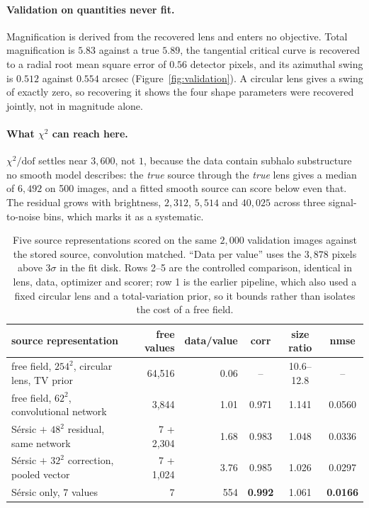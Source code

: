 \documentclass{article}
\begin{document}
\paragraph{Validation on quantities never fit.} Magnification is derived from the
recovered lens and enters no objective. Total magnification is $5.83$ against a
true $5.89$, the tangential critical curve is recovered to a radial root mean
square error of $0.56$ detector pixels, and its azimuthal swing is $0.512$
against $0.554$ arcsec (Figure~\ref{fig:validation}). A circular lens gives a
swing of exactly zero, so recovering it shows the four shape parameters were
recovered jointly, not in magnitude alone.

\paragraph{What $\chi^{2}$ can reach here.} $\chi^{2}/\mathrm{dof}$ settles near
$3{,}600$, not $1$, because the data contain subhalo substructure no smooth model
describes: the \emph{true} source through the \emph{true} lens gives a median of
$6{,}492$ on 500 images, and a fitted smooth source can score below even that.
The residual grows with brightness, $2{,}312$, $5{,}514$ and $40{,}025$ across
three signal-to-noise bins, which marks it as a systematic.

\begin{table}[t]
  \caption{Five source representations scored on the same $2{,}000$ validation
  images against the stored source, convolution matched. ``Data per value'' uses
  the $3{,}878$ pixels above $3\sigma$ in the fit disk. Rows 2--5 are the
  controlled comparison, identical in lens, data, optimizer and scorer; row 1 is
  the earlier pipeline, which also used a fixed circular lens and a
  total-variation prior, so it bounds rather than isolates the cost of a free
  field.}
  \label{tab:reps}
  \centering
  \footnotesize
  \begin{tabular}{lrrccc}
    \toprule
    source representation & free values & data/value & corr & size ratio & nmse \\
    \midrule
    free field, $254^{2}$, circular lens, TV prior & 64,516 & 0.06 & -- & 10.6--12.8 & -- \\
    free field, $62^{2}$, convolutional network & 3,844 & 1.01 & 0.971 & 1.141 & 0.0560 \\
    S\'ersic $+$ $48^{2}$ residual, same network & 7 + 2,304 & 1.68 & 0.983 & 1.048 & 0.0336 \\
    S\'ersic $+$ $32^{2}$ correction, pooled vector & 7 + 1,024 & 3.76 & 0.985 & 1.026 & 0.0297 \\
    S\'ersic only, 7 values & 7 & 554 & \textbf{0.992} & 1.061 & \textbf{0.0166} \\
    \bottomrule
  \end{tabular}
\end{table}
\end{document}
